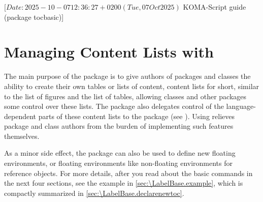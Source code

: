 %
%
%
%
%
%
%

                 [$Date: 2025-10-07 12:36:27 +0200 (Tue, 07 Oct 2025) $
                  KOMA-Script guide (package tocbasic)]


\chapter{Managing Content Lists with }
\BeginIndexGroup%
%
%
%
%
The main purpose of the  package is to give authors of
packages and classes the ability to create their own tables or lists of
content, content lists for short, similar to the list of figures and the list
of tables, allowing classes and other packages some control over these lists.
The  package also delegates control of the
language-dependent parts of these content lists to the
 package (see \cite{package:babel}). Using
 relieves package and class authors from the burden of
implementing such features themselves.

As a minor side effect, the package can also be used to define new floating
environments, or floating environments like non-floating environments for
reference objects. For more details, after you read about the basic commands
in the next four sections, see the example in \autoref{sec:\LabelBase.example},
which is compactly summarized in \autoref{sec:\LabelBase.declarenewtoc}.

